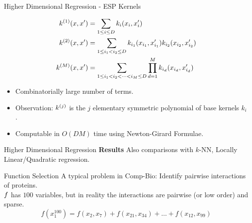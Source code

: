 \begin{frame}{Higher Dimensional Regression - ESP Kernels}

\begin{align*}
k^{(1)}(x,x') &= \sum_{1\leq i \leq D} k_i(x_i, x'_i) \\
k^{(2)}(x,x') &= \sum_{1\leq i_1 < i_2 \leq D} 
k_{i_1}(x_{i_1},x'_{i_1})  k_{i_2}(x_{i_2},x'_{i_2})\\
k^{(M)}(x,x') &= \sum_{1\leq i_1 < i_2 < \dots < i_M \leq D} 
  \prod_{d=1}^M k_{i_d}(x_{i_d}, x'_{i_d}) 
\end{align*}
\pause
\vspace{0.1in}
\begin{itemize}
\item Combinatorially large number of terms.
\item Observation: $k^{(j)}$ is the $j$ elementary symmetric
polynomial of base kernels $k_i$.
\item Computable in $O(DM)$ time using Newton-Girard Formulae.
\end{itemize}
 
\end{frame}


\begin{frame}{Higher Dimensional Regression}
\textbf{Results}
\vspace{0.1in}
\insertTableRealDataPres 
\vspace{0.2in}
Also comparisons with $k$-NN, Locally Linear/Quadratic
regression.
\end{frame}


\begin{frame}{Function Selection}
A typical problem in Comp-Bio: Identify pairwise interactions of proteins. \\
\vspace{0.1in}
$f$ has $100$ variables, but in reality the interactions are pairwise (or
low order) and sparse.
\[
f(x_1^{100}) = f(x_2,x_7) + f(x_{21},x_{34}) + \dots + f(x_{12},x_{99})
\]

\end{frame}

